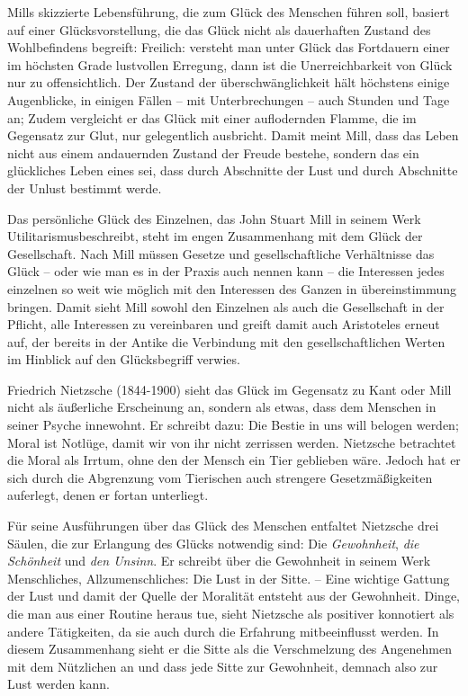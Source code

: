 Mills skizzierte Lebensführung, die zum Glück des Menschen führen soll, basiert auf einer Glücksvorstellung, die das Glück nicht als dauerhaften Zustand des Wohlbefindens begreift: 
\glqq Freilich: versteht man unter Glück das Fortdauern einer im höchsten Grade lustvollen Erregung, dann ist die Unerreichbarkeit von Glück nur zu offensichtlich. 
Der Zustand der überschwänglichkeit hält höchstens einige Augenblicke, in einigen Fällen -- mit Unterbrechungen -- auch Stunden und Tage an;\grqq{}\cite{JM94, S.23}
 Zudem vergleicht er das Glück mit einer auflodernden Flamme, die im Gegensatz zur Glut, nur gelegentlich ausbricht. 
 Damit meint Mill, dass das Leben nicht aus einem andauernden Zustand der Freude bestehe, sondern das ein glückliches Leben eines sei, dass durch Abschnitte der Lust und durch Abschnitte der Unlust bestimmt werde.
 
Das persönliche Glück des Einzelnen, das John Stuart Mill in seinem Werk \glqq Utilitarismus\grqq beschreibt, steht im engen Zusammenhang mit dem Glück der Gesellschaft. 
Nach Mill müssen \glqq Gesetze und gesellschaftliche Verhältnisse das Glück -- oder wie man es in der Praxis auch nennen kann -- die Interessen jedes einzelnen so weit wie möglich mit den Interessen des Ganzen in übereinstimmung bringen.\grqq{}\cite{JM94, S.30}
Damit sieht Mill sowohl den Einzelnen als auch die Gesellschaft in der Pflicht, alle Interessen zu vereinbaren und greift damit auch Aristoteles erneut auf, der bereits in der Antike die Verbindung mit den gesellschaftlichen Werten im Hinblick auf den Glücksbegriff verwies.

Friedrich Nietzsche (1844-1900) sieht das Glück im Gegensatz zu Kant oder Mill nicht als äußerliche Erscheinung an, sondern als etwas, dass dem Menschen in seiner Psyche innewohnt. 
Er schreibt dazu: \glqq Die Bestie in uns will belogen werden; Moral ist Notlüge, damit wir von ihr nicht zerrissen werden.\grqq{}\cite{FN06, S.57}
Nietzsche betrachtet die Moral als Irrtum, ohne den der Mensch ein Tier geblieben wäre. 
Jedoch hat er sich durch die Abgrenzung vom Tierischen auch strengere Gesetzmäßigkeiten auferlegt, denen er fortan unterliegt.

Für seine Ausführungen über das Glück des Menschen entfaltet Nietzsche drei Säulen, die zur Erlangung des Glücks notwendig sind: Die \textit{Gewohnheit}, \textit{die Schönheit} und \textit{den Unsinn}. 
Er schreibt über die Gewohnheit in seinem Werk \glqq Menschliches, Allzumenschliches\grqq{}: \glqq Die Lust in der Sitte. -- Eine wichtige Gattung der Lust und damit der Quelle der Moralität entsteht aus der Gewohnheit.\grqq{}\cite{FN06, S.84}
Dinge, die man aus einer Routine heraus tue, sieht Nietzsche als positiver konnotiert als andere Tätigkeiten, da sie auch durch die Erfahrung mitbeeinflusst werden. 
In diesem Zusammenhang sieht er die Sitte als die Verschmelzung des Angenehmen mit dem Nützlichen an und dass jede Sitte zur Gewohnheit, demnach also zur Lust werden kann.

